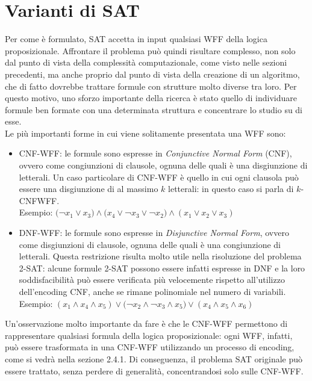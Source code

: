 \section{Varianti di SAT}
Per come è formulato, SAT accetta in input qualsiasi WFF della logica proposizionale.
Affrontare il problema può quindi risultare complesso, non solo dal punto di vista della complessità computazionale, come visto nelle
sezioni precedenti, ma anche proprio dal punto di vista della creazione di un algoritmo, che di fatto dovrebbe trattare formule 
con strutture molto diverse tra loro.
Per questo motivo, uno sforzo importante della ricerca è stato quello di individuare formule ben formate con una determinata
struttura e concentrare lo studio su di esse.\\
Le più importanti forme in cui viene solitamente presentata una WFF sono:
\begin{itemize}
    \item CNF-WFF: le formule sono espresse in \textit{Conjunctive Normal Form} (CNF), 
    ovvero come congiunzioni di clausole, ognuna delle quali è una disgiunzione di letterali.
    Un caso particolare di CNF-WFF è quello in cui ogni clausola può essere una disgiunzione di al massimo $k$ letterali:
    in questo caso si parla di $k$-CNFWFF.\\
    Esempio: $($¬$x_1 \lor x_3) \land (x_4 \lor $¬$x_3 \lor $¬$x_2) \land (x_1\lor x_2 \lor x_3)$
    \item DNF-WFF: le formule sono espresse in \textit{Disjunctive Normal Form}, ovvero come disgiunzioni
    di clausole, ognuna delle quali è una congiunzione di letterali.
    Questa restrizione risulta molto utile 
    nella risoluzione del problema 2-SAT: alcune formule 2-SAT possono essere infatti espresse in DNF e la
    loro soddisfacibilità può essere verificata più velocemente rispetto all'utilizzo dell'encoding CNF, anche 
    se rimane polinomiale nel numero di variabili.\\
    Esempio: $(x_1 \land x_4 \land x_5) \lor ($¬$x_2 \land $¬$x_3 \land x_5) \lor (x_4\land x_5 \land x_6)$
\end{itemize}
Un'osservazione molto importante da fare è che le CNF-WFF permettono di rappresentare qualsiasi formula della logica proposizionale: 
ogni WFF, infatti, può essere trasformata in una CNF-WFF utilizzando un processo di encoding,
come si vedrà nella sezione 2.4.1.
Di conseguenza, il problema SAT originale può essere trattato, senza perdere di generalità,
concentrandosi solo sulle CNF-WFF.\\
